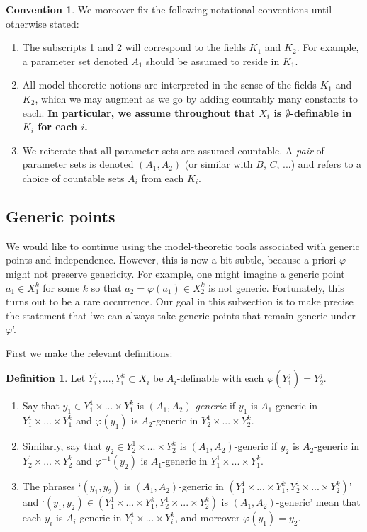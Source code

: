 \documentclass{amsart}
\theoremstyle{definition}
\newtheorem{definition}[theorem]{Definition}
\newtheorem{convention}[theorem]{Convention}
\begin{document}
\begin{convention} We moreover fix the following notational conventions until otherwise stated:
\begin{enumerate}
    \item The subscripts 1 and 2 will correspond to the fields $K_1$ and $K_2$. For example, a parameter set denoted $A_1$ should be assumed to reside in $K_1$.
    \item All model-theoretic notions are interpreted in the sense of the fields $K_1$ and $K_2$, which we may augment as we go by adding countably many constants to each. \textbf{In particular, we assume throughout that $X_i$ is $\emptyset$-definable in $K_i$ for each $i$.}
    \item We reiterate that all parameter sets are assumed countable. A \textit{pair} of parameter sets is denoted $(A_1,A_2)$ (or similar with $B$, $C$, ...) and refers to a choice of countable sets $A_i$ from each $K_i$.
    \end{enumerate}
\end{convention}

\subsection{Generic points}

We would like to continue using the model-theoretic tools associated with generic points and independence. However, this is now a bit subtle, because a priori $\varphi$ might not preserve genericity. For example, one might imagine a generic point $a_1\in X_1^k$ for some $k$ so that $a_2=\varphi(a_1)\in X_2^k$ is not generic. Fortunately, this turns out to be a rare occurrence. Our goal in this subsection is to make precise the statement that `we can always take generic points that remain generic under $\varphi$'.

First we make the relevant definitions:

\begin{definition}\label{D: generic pair}
    Let $Y_i^1,...,Y_i^k\subset X_i$ be $A_i$-definable with each $\varphi(Y_1^j)=Y_2^j$.
    \begin{enumerate}
        \item Say that $y_1\in Y_1^1\times...\times Y_1^k$ is $(A_1,A_2)$-\textit{generic} if $y_1$ is $A_1$-generic in $Y_1^1\times...\times Y_1^k$ and $\varphi(y_1)$ is $A_2$-generic in $Y_2^1\times...\times Y_2^k$. 
        \item Similarly, say that $y_2\in Y_2^1\times...\times Y_2^k$ is $(A_1,A_2)$-generic if $y_2$ is $A_2$-generic in $Y_2^1\times...\times Y_2^k$ and $\varphi^{-1}(y_2)$ is $A_1$-generic in $Y_1^1\times...\times Y_1^k$.
        \item The phrases `$(y_1,y_2)$ is $(A_1,A_2)$-generic in $(Y_1^1\times...\times Y_1^k,Y_2^1\times...\times Y_2^k)$' and `$(y_1,y_2)\in(Y_1^1\times...\times Y_1^k,Y_2^1\times...\times Y_2^k)$ is $(A_1,A_2)$-generic' mean that each $y_i$ is $A_i$-generic in $Y_i^1\times...\times Y_i^k$, and moreover $\varphi(y_1)=y_2$.
    \end{enumerate}
\end{definition}
\end{document}
